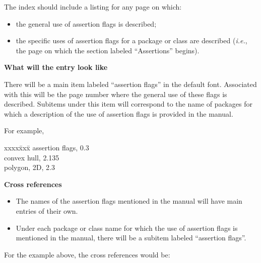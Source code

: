 \documentclass[11pt]{article}
\newenvironment{indexex}{\begin{tabbing}
xxxx\=xxx\=\kill}{\end{tabbing}}
\begin{document}
\begin{description}
   \item[\bf Which pages]
  
         The index should include a listing for any page on which:
      \begin{itemize}
          \item the general use of assertion flags is described;
          \item the specific uses of assertion flags for 
                a package or class are described 
                ({\em i.e.}, the page on which the section labeled 
                 ``Assertions'' begins).
      \end{itemize}

   \item {\bf What will the entry look like}

      There will be a main item labeled ``assertion flags'' in the default
      font.  Associated with
      this will be the page number where the general use of these flags is
      described.  Subitems under this item will correspond to the name of
      packages for which a description of the use of assertion flags is 
      provided in the manual. 

      For example, 

           \begin{indexex}
           assertion flags,                                 0.3       \\
            \> convex hull,                                 2.135     \\
            \> polygon, 2D,                                 2.3   
           \end{indexex}


   \item {\bf Cross references}
      
      \begin{itemize}
         \item The names of the assertion flags mentioned in the 
               manual will have main entries of their own.
         \item Under each package or class name for which the use of
               assertion flags is mentioned in the manual, there will be
               a subitem labeled ``assertion flags''.
      \end{itemize}

      For the example above, the cross references would be:


\end{description}
\end{document}
